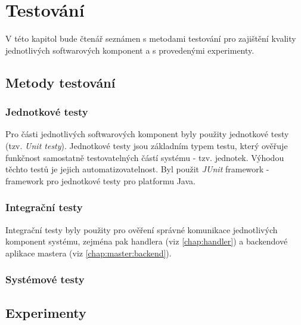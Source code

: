 

\chapter{Testování}\label{chap:test}
V této kapitol bude čtenář seznámen s metodami testování pro zajištění kvality jednotlivých softwarových komponent a s provedenými experimenty.

\section{Metody testování}
\subsection{Jednotkové testy}
Pro části jednotlivých softwarových komponent byly použity jednotkové testy \cite{testing_evans} (tzv. \textit{Unit testy}). Jednotkové testy jsou základním typem testu, který ověřuje funkčnost samostatně testovatelných částí systému - tzv. jednotek. Výhodou těchto testů je jejich automatizovatelnost. Byl použit \textit{JUnit} framework - framework pro jednotkové testy pro platformu Java. 

\subsection{Integrační testy}
Integrační testy byly použity pro ověření správné komunikace jednotlivých komponent systému, zejména pak handlera (viz \ref{chap:handler}) a backendové aplikace mastera (viz \ref{chap:master:backend}).

\subsection{Systémové testy}

\section{Experimenty}